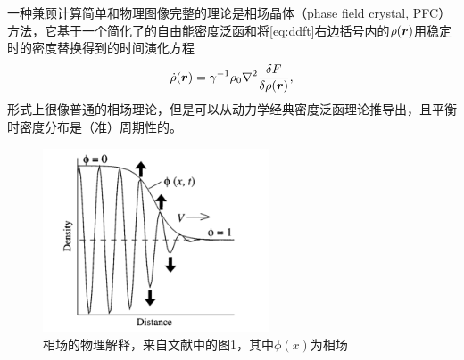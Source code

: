 \documentclass[hyperref, UTF8, a4paper]{ctexart}
\begin{document}
一种兼顾计算简单和物理图像完整的理论是相场晶体（phase field crystal, PFC）方法，它基于一个简化了的自由能密度泛函和将\eqref{eq:ddft}右边括号内的$\rho(\vb*{r})$用稳定时的密度替换得到的时间演化方程
\begin{equation}
    \dot{\rho}(\vb*{r}) = \gamma^{-1} \rho_0 \laplacian \fdv{F}{\rho(\vb*{r})},
    \label{eq:pfc-eom}
\end{equation}
形式上很像普通的相场理论，但是可以从动力学经典密度泛函理论推导出，且平衡时密度分布是（准）周期性的\cite{pfc2009,PhysRevB.75.064107}。

\begin{figure}
    \centering
    \includegraphics[width=0.6\textwidth]{phase-field.PNG}
    \caption{相场的物理解释，来自文献\cite{boettinger2002phase}中的图1，其中$\phi(x)$为相场}
    \label{fig:phase-field}
\end{figure}
\end{document}
